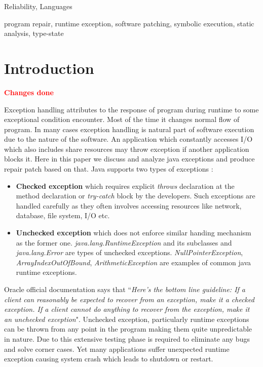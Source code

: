 \documentclass{sigplanconf}
\begin{document}

\terms
Reliability, Languages 

\keywords
program repair, runtime exception, software patching, symbolic execution, static analysis, type-state

\section{Introduction}
\label{sec:intro}

\textcolor{red}{\textbf{Changes done}}\newline

Exception handling attributes to the response of program during runtime to some exceptional condition encounter. Most of the time it changes normal flow of program. In many cases exception handling is natural part of software execution due to the nature of the software. An application which constantly accesses I/O which also includes share resources may throw exception if another application blocks it. Here in this paper we discuss and analyze java exceptions and produce repair patch based on that. Java supports two types of exceptions : 
\begin{itemize}
	
	\item \textbf{Checked exception} which requires explicit \emph{throws} declaration at the method declaration or \emph{try-catch} block by the developers. Such exceptions are handled carefully as they often involves accessing resources like network, database, file system, I/O etc. 
	
	\item \textbf{Unchecked exception} which does not enforce similar handing mechanism as the former one. \emph{java.lang.RuntimeException} and its subclasses and \emph{java.lang.Error} are types of unchecked exceptions. \emph{NullPointerException}, \emph{ArrayIndexOutOfBound}, \emph{ArithmeticException} are examples of common java runtime exceptions.

\end{itemize}

Oracle official documentation says that ``\emph{Here's the bottom line guideline: If a client can reasonably be expected to recover from an exception, make it a checked exception. If a client cannot do anything to recover from the exception, make it an unchecked exception}".  Unchecked exception, particularly runtime exceptions can be thrown from any point in the program making them quite unpredictable in nature. Due to this extensive testing phase is required to eliminate any bugs and solve corner cases. Yet many applications suffer unexpected runtime exception causing system crash which leads to shutdown or restart.
\end{document}
